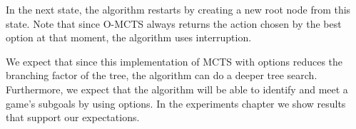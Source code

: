 In the next state, the algorithm restarts by creating a new root node from
this state. Note that since O-MCTS always returns the action chosen by the best
option at that moment, the algorithm uses interruption.

We expect that since this implementation of MCTS with options reduces the
branching factor of the tree, the algorithm can do a deeper tree search.
Furthermore, we expect that the algorithm will be able to
identify and meet a game's subgoals by using options. In the experiments chapter we show results
that support our expectations.
